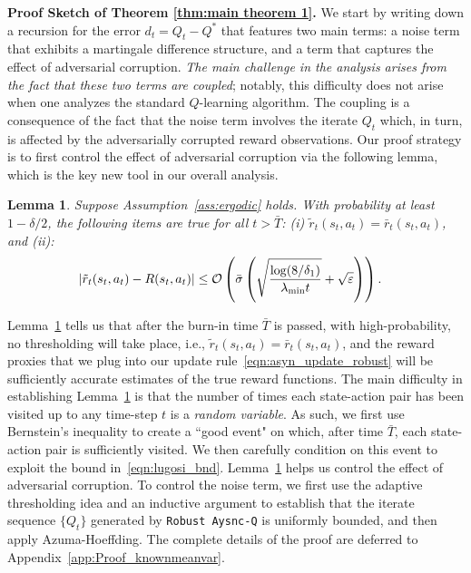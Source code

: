 \documentclass{article}
\newcommand{\mc}{\mathcal}
\newtheorem{lemma}{Lemma}
\begin{document}
\textbf{Proof Sketch of  Theorem \ref{thm:main theorem 1}.} We start by writing down a recursion for the error $d_t =Q_t - Q^*$ that features two main terms: a noise term that exhibits a martingale difference structure, and a term that captures the effect of adversarial corruption. \emph{The main challenge in the analysis arises from the fact that these two terms are coupled}; notably, this difficulty does not arise when one analyzes the standard \(Q\)-learning algorithm. The coupling is a consequence of the fact that the noise term involves the iterate $Q_t$ which, in turn, is affected by the adversarially corrupted reward observations. Our proof strategy is to first control the effect of adversarial corruption via the following lemma, which is the key new tool in our overall analysis. 

\begin{lemma}
\label{lemma:robustrewardbnd}
Suppose Assumption~\ref{ass:ergodic} holds. With probability at least $1-\delta/2$, the following items are true for all $t > \bar{T}$: (i) $\tilde{r}_t(s_t, a_t) =\bar{r}_t(s_t, a_t)$, and (ii):  
$$ \hspace{-3mm} \vert \tilde{r}_t(s_t, a_t) - R(s_t, a_t)| \leq \mc{{O}}\left(\bar{\sigma} \left( \sqrt{ \frac{\log(8/\delta_1)}{ \lambda_{{\min}} t} } + \sqrt{\varepsilon} \right) \right).$$
\end{lemma}
Lemma~\ref{lemma:robustrewardbnd} tells us that after the burn-in time $\bar{T}$ is passed, with high-probability, no thresholding will take place, i.e., $\tilde{r}_t(s_t, a_t) =\bar{r}_t(s_t, a_t)$, and the reward proxies that we plug into our update rule~\eqref{eqn:asyn_update_robust} will be sufficiently accurate estimates of the true reward functions. 
The main difficulty in establishing Lemma~\ref{lemma:robustrewardbnd} is that the number of times each state-action pair has been visited up to any time-step $t$ is a \emph{random variable}. As such, we first use Bernstein's inequality to create a ``good event" on which, after time $\bar{T}$, each state-action pair is sufficiently visited. We then carefully condition on this event to exploit the bound in~\eqref{eqn:lugosi_bnd}. Lemma~\ref{lemma:robustrewardbnd} helps us control the effect of adversarial corruption. To control the noise term, we first use the adaptive thresholding idea and an inductive argument to establish that the iterate sequence $\{Q_t\}$ generated by \texttt{Robust Aysnc-Q} is uniformly bounded, and then apply Azuma-Hoeffding. The complete details of the proof are deferred to Appendix~\ref{app:Proof_knownmeanvar}. 
\end{document}
